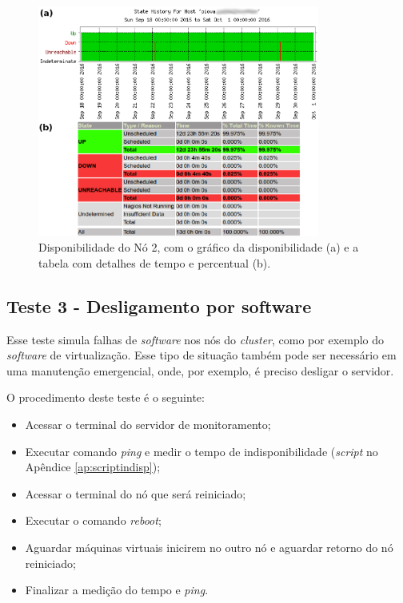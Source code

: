 \begin{figure}[h!]
 \centering
 \includegraphics[width=350px]{img/teste2_piova1.eps}
 \caption{Disponibilidade do Nó 2, com o gráfico da disponibilidade (a) e a tabela com detalhes de tempo e percentual (b).}
 \label{fig:teste2_piova1}
\end{figure}



\subsection{Teste 3 - Desligamento por software}

Esse teste simula falhas de \textit{software} nos nós do \textit{cluster}, como por exemplo do \textit{software} de virtualização. Esse tipo de 
situação também pode ser necessário em uma manutenção emergencial, onde, por exemplo, é preciso desligar o servidor.

O procedimento deste teste é o seguinte:
\begin{itemize}
 \item Acessar o terminal do servidor de monitoramento;
 \item Executar comando \textit{ping} e medir o tempo de indisponibilidade (\textit{script} no Apêndice \ref{ap:scriptindisp});
 \item Acessar o terminal do nó que será reiniciado;
 \item Executar o comando \textit{reboot};
 \item Aguardar máquinas virtuais inicirem no outro nó e aguardar retorno do nó reiniciado;
 \item Finalizar a medição do tempo e \textit{ping}.
\end{itemize}

